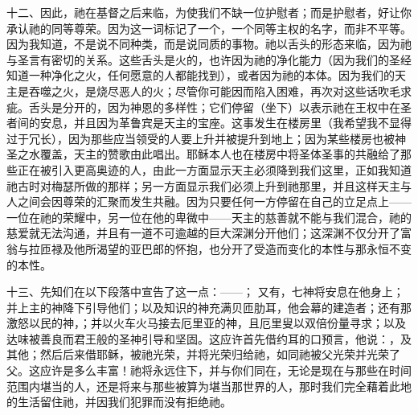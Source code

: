 十二、因此，祂在基督之后来临，为使我们不缺一位护慰者；而是护慰者，好让你承认祂的同等尊荣。因为这一词标记了一个，一个同等主权的名字，而非不平等。因为我知道，不是说不同种类，而是说同质的事物。祂以舌头的形态来临，因为祂与圣言有密切的关系。这些舌头是火的，也许因为祂的净化能力（因为我们的圣经知道一种净化之火，任何愿意的人都能找到），或者因为祂的本体。因为我们的天主是吞噬之火，是烧尽恶人的火；尽管你可能因而陷入困难，再次对这些话吹毛求疵。舌头是分开的，因为神恩的多样性；它们停留（坐下）以表示祂在王权中在圣者间的安息，并且因为革鲁宾是天主的宝座。这事发生在楼房里（我希望我不显得过于冗长），因为那些应当领受的人要上升并被提升到地上；因为某些楼房也被神圣之水覆盖，天主的赞歌由此唱出。耶稣本人也在楼房中将圣体圣事的共融给了那些正在被引入更高奥迹的人，由此一方面显示天主必须降到我们这里，正如我知道祂古时对梅瑟所做的那样；另一方面显示我们必须上升到祂那里，并且这样天主与人之间会因尊荣的汇聚而发生共融。因为只要任何一方停留在自己的立足点上——一位在祂的荣耀中，另一位在他的卑微中——天主的慈善就不能与我们混合，祂的慈爱就无法沟通，并且有一道不可逾越的巨大深渊分开他们；这深渊不仅分开了富翁与拉匝禄及他所渴望的亚巴郎的怀抱，也分开了受造而变化的本性与那永恒不变的本性。\par

十三、先知们在以下段落中宣告了这一点：——； 又有，七神将安息在他身上；并上主的神降下引导他们；以及知识的神充满贝匝肋耳，他会幕的建造者；还有那激怒以民的神，；并以火车火马接去厄里亚的神，且厄里叟以双倍份量寻求；以及达味被善良而君王般的圣神引导和坚固。这应许首先借约耳的口预言，他说：，及其他；然后后来借耶稣，被祂光荣，并将光荣归给祂，如同祂被父光荣并光荣了父。这应许是多么丰富！祂将永远住下，并与你们同在，无论是现在与那些在时间范围内堪当的人，还是将来与那些被算为堪当那世界的人，那时我们完全藉着此地的生活留住祂，并因我们犯罪而没有拒绝祂。\par


